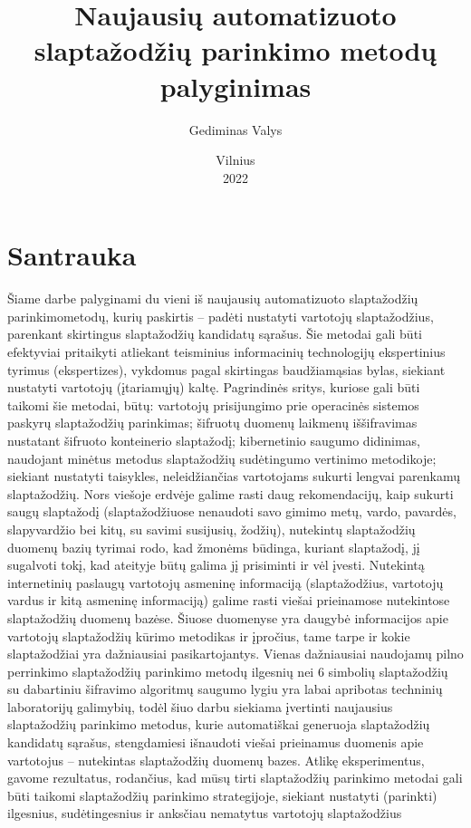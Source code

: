 \documentclass{VUMIFInfBakalaurinis}
\institute{Informacinių sistemų inžinerijos studijų programa}
\title{Naujausių automatizuoto slaptažodžių parinkimo metodų palyginimas}
\author{Gediminas Valys}
\date{Vilnius \\ 2022}
\begin{document}
\maketitle

\tableofcontents


\section{Santrauka}
Šiame darbe palyginami du vieni iš naujausių automatizuoto slaptažodžių 
parinkimometodų, kurių paskirtis -- padėti nustatyti vartotojų slaptažodžius, 
parenkant skirtingus slaptažodžių kandidatų sąrašus. Šie metodai gali būti 
efektyviai pritaikyti atliekant teisminius informacinių technologijų 
ekspertinius tyrimus (ekspertizes), vykdomus pagal skirtingas baudžiamąsias 
bylas, siekiant nustatyti vartotojų (įtariamųjų) kaltę. Pagrindinės sritys, 
kuriose gali būti taikomi šie metodai, būtų: vartotojų prisijungimo prie 
operacinės sistemos paskyrų slaptažodžių parinkimas; šifruotų duomenų laikmenų 
iššifravimas nustatant šifruoto konteinerio slaptažodį; kibernetinio saugumo 
didinimas, naudojant minėtus metodus slaptažodžių sudėtingumo vertinimo 
metodikoje; siekiant nustatyti taisykles, neleidžiančias vartotojams sukurti 
lengvai parenkamų slaptažodžių. Nors viešoje erdvėje galime rasti daug 
rekomendacijų, kaip sukurti saugų slaptažodį (slaptažodžiuose nenaudoti savo 
gimimo metų, vardo, pavardės, slapyvardžio bei kitų, su savimi susijusių, 
žodžių), nutekintų slaptažodžių duomenų bazių tyrimai rodo, kad žmonėms būdinga, 
kuriant slaptažodį, jį sugalvoti tokį, kad ateityje būtų galima jį prisiminti ir 
vėl įvesti. Nutekintą internetinių paslaugų vartotojų asmeninę informaciją 
(slaptažodžius, vartotojų vardus ir kitą asmeninę informaciją) galime rasti 
viešai prieinamose nutekintose slaptažodžių duomenų bazėse. Šiuose duomenyse yra 
daugybė informacijos apie vartotojų slaptažodžių kūrimo metodikas ir įpročius, 
tame tarpe ir kokie slaptažodžiai yra dažniausiai pasikartojantys. Vienas 
dažniausiai naudojamų pilno perrinkimo slaptažodžių parinkimo metodų ilgesnių 
nei 6 simbolių slaptažodžių su dabartiniu šifravimo algoritmų saugumo lygiu yra 
labai apribotas techninių laboratorijų galimybių, todėl šiuo darbu siekiama 
įvertinti naujausius slaptažodžių parinkimo metodus, kurie automatiškai 
generuoja slaptažodžių kandidatų sąrašus, stengdamiesi išnaudoti viešai 
prieinamus duomenis apie vartotojus -- nutekintas slaptažodžių duomenų bazes. 
Atlikę eksperimentus, gavome rezultatus, rodančius, kad mūsų tirti slaptažodžių 
parinkimo metodai gali būti taikomi slaptažodžių parinkimo strategijoje, 
siekiant nustatyti (parinkti) ilgesnius, sudėtingesnius ir anksčiau nematytus 
vartotojų slaptažodžius
\end{document}
